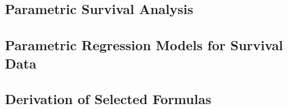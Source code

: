 \documentclass[12pt,]{article}
\begin{document}
\hypertarget{parametric-survival-analysis}{%
\subsection{Parametric Survival
Analysis}\label{parametric-survival-analysis}}

\hypertarget{parametric-regression-models-for-survival-data}{%
\subsection{Parametric Regression Models for Survival
Data}\label{parametric-regression-models-for-survival-data}}

\hypertarget{derivation-of-selected-formulas-1}{%
\subsection{Derivation of Selected
Formulas}\label{derivation-of-selected-formulas-1}}


\end{document}
